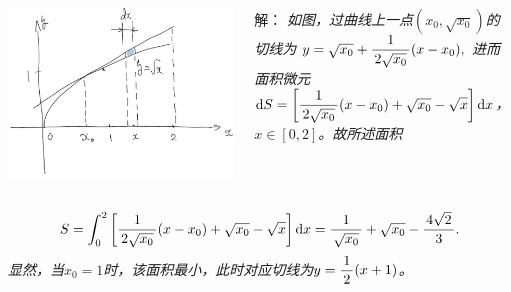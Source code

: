 \begin{frame}
	\linespread{1.5}
	\pause
	
	
	\begin{columns}
		\begin{column}{.4\textwidth}
			\begin{center}
				\includegraphics[width=\textwidth]{./images/ch6/ySqtXx.jpg}
			\end{center}		
		\end{column}
		\begin{column}{.6\textwidth}
			\small 解：\it
			如图，过曲线上一点$(x_0,\sqrt{x_0})$的切线为
			$y=\sqrt{x_0}+\displaystyle\frac{\,{1}\,}{\,{2\sqrt{x_0}}\,}(x-x_0),$
			进而面积微元
			$\mathrm{d} S=\left[\displaystyle\frac{\,{1}\,}{\,{2\sqrt{x_0}}\,}(x-x_0)+\sqrt{x_0}-\sqrt{x}\right]\mathrm{d}
			x$，$x\in[0,2]$。故所述面积
		\end{column}
	\end{columns}
	\small\it
	$$S=\displaystyle\int_0^2\left[\displaystyle\frac{\,{1}\,}{\,{2\sqrt{x_0}}\,}(x-x_0)+\sqrt{x_0}-\sqrt{x}\right]
	\mathrm{d} x=\displaystyle\frac{\,{1}\,}{\,{\sqrt{x_0}}\,}+\sqrt{x_0}-\displaystyle\frac{\,{4\sqrt2}\,}{\,{3}\,}.$$
	显然，当$x_0=1$时，该面积最小，此时对应切线为$y=\displaystyle\frac{\,{1}\,}{\,{2}\,}(x+1)$。
\end{frame}

